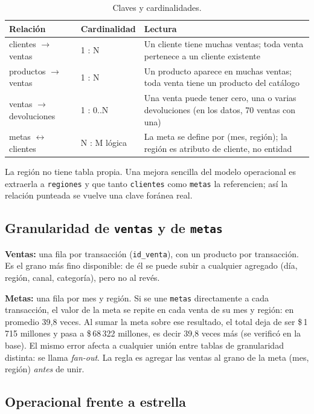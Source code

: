 \documentclass[11pt,letterpaper]{article}
\newcommand{\cop}[1]{\$\,#1}
\begin{document}
\begin{table}[H]
\centering
\caption{Claves y cardinalidades.}
\begin{tabularx}{\linewidth}{l l L}
\toprule
Relación & Cardinalidad & Lectura \\
\midrule
clientes $\rightarrow$ ventas & 1 : N & Un cliente tiene muchas ventas; toda venta pertenece a un cliente existente \\
productos $\rightarrow$ ventas & 1 : N & Un producto aparece en muchas ventas; toda venta tiene un producto del catálogo \\
ventas $\rightarrow$ devoluciones & 1 : 0..N & Una venta puede tener cero, una o varias devoluciones (en los datos, 70 ventas con una) \\
metas $\leftrightarrow$ clientes & N : M lógica & La meta se define por (mes, región); la región es atributo de cliente, no entidad \\
\bottomrule
\end{tabularx}
\end{table}

La región no tiene tabla propia. Una mejora sencilla del modelo operacional es extraerla a \texttt{regiones} y
que tanto \texttt{clientes} como \texttt{metas} la referencien; así la relación punteada se vuelve una clave foránea
real.

\subsection{Granularidad de \texttt{ventas} y de \texttt{metas}}

\textbf{Ventas:} una fila por transacción (\texttt{id\_venta}), con un producto por transacción. Es el grano más fino
disponible: de él se puede subir a cualquier agregado (día, región, canal, categoría), pero no al revés.

\textbf{Metas:} una fila por mes y región. Si se une \texttt{metas} directamente a cada transacción, el valor de la
meta se repite en cada venta de su mes y región: en promedio 39,8 veces. Al sumar la meta sobre ese resultado, el
total deja de ser \cop{1\,715} millones y pasa a \cop{68\,322} millones, es decir 39,8 veces más (se verificó
en la base). El mismo error afecta a cualquier unión entre tablas de granularidad distinta: se llama
\emph{fan-out}. La regla es agregar las ventas al grano de la meta (mes, región) \emph{antes} de unir.

\subsection{Operacional frente a estrella}
\end{document}
